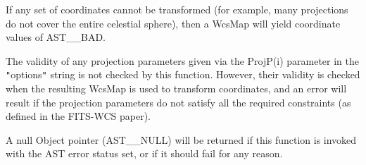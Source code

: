 \documentclass[twoside,11pt]{article}
\newcommand{\htmlref}[2]{#1}
\begin{document}
{{{         \sstitem
         If any set of coordinates cannot be transformed (for example,
         many projections do not cover the entire celestial sphere), then
         a WcsMap will yield coordinate values of AST\_\_BAD.

         \sstitem
         The validity of any projection parameters given via the ProjP(i)
         parameter in the {\tt{"}}options{\tt{"}} string is not checked by this
         function. However, their validity is checked when the resulting
         WcsMap is used to transform coordinates, and an error will
         result if the projection parameters do not satisfy all the
         required constraints (as defined in the FITS-WCS paper).

         \sstitem
         A null \htmlref{Object}{Object} pointer (AST\_\_NULL) will be returned if this
         function is invoked with the AST error status set, or if it
         should fail for any reason.
      }
   }
}
\end{document}
